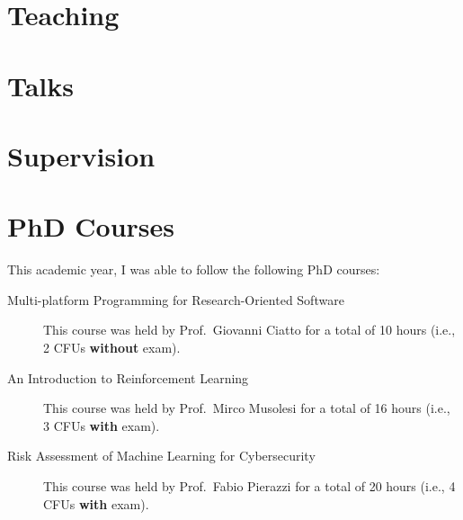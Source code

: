 \documentclass[
]{ceurart}
\begin{document}
\section{Teaching}
\label{sec:results}

\section{Talks}
\label{sec:talks}

\section{Supervision}
\label{sec:supervision}

\section{PhD Courses}
\label{sec:phd-courses}

This academic year, I was able to follow the following PhD courses:
\begin{description}
    \item[Multi-platform Programming for Research-Oriented Software] This course was held by Prof.~Giovanni Ciatto for a total of 10 hours (i.e., 2 CFUs \textbf{without} exam).
    \item[An Introduction to Reinforcement Learning] This course was held by Prof.~Mirco Musolesi for a total of 16 hours (i.e., 3 CFUs \textbf{with} exam).
    \item[Risk Assessment of Machine Learning for Cybersecurity] This course was held by Prof.~Fabio Pierazzi for a total of 20 hours (i.e., 4 CFUs \textbf{with} exam).
\end{description}
\end{document}
